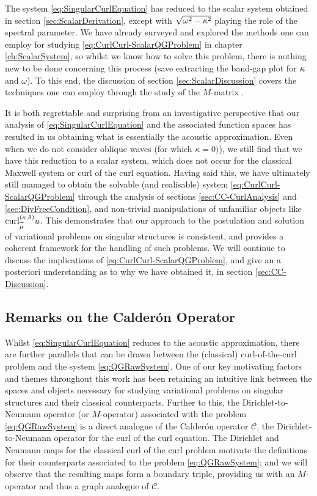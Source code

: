 The system \eqref{eq:SingularCurlEquation} has reduced to the scalar system obtained in section \ref{sec:ScalarDerivation}, except with $\sqrt{\omega^2-\kappa^2}$ playing the role of the spectral parameter.
We have already surveyed and explored the methods one can employ for studying \eqref{eq:CurlCurl-ScalarQGProblem} in chapter \ref{ch:ScalarSystem}, so whilst we know how to solve this problem, there is nothing new to be done concerning this process (save extracting the band-gap plot for $\kappa$ and $\omega$).
To this end, the discussion of section \ref{sec:ScalarDiscussion} covers the techniques one can employ through the study of the $M$-matrix .

It is both regrettable and surprising from an investigative perspective that our analysis of \eqref{eq:SingularCurlEquation} and the associated function spaces has resulted in us obtaining what is essentially the acoustic approximation.
Even when we do not consider oblique waves (for which $\kappa=0)$), we still find that we have this reduction to a scalar system, which does not occur for the classical Maxwell system or curl of the curl equation.
Having said this, we have ultimately still managed to obtain the solvable (and realisable) system \eqref{eq:CurlCurl-ScalarQGProblem} through the analysis of sections \ref{sec:CC-CurlAnalysis} and \ref{sec:DivFreeCondition}, and non-trivial manipulations of unfamiliar objects like $\mathrm{curl}_{\widetilde{\mu}}^{\left( \kappa, \theta \right)}u$.
This demonstrates that our approach to the postulation and solution of variational problems on singular structures is consistent, and provides a coherent framework for the handling of such problems.
We will continue to discuss the implications of \eqref{eq:CurlCurl-ScalarQGProblem}, and give an a posteriori understanding as to why we have obtained it, in section \ref{sec:CC-Discussion}.

\subsection{Remarks on the Calder\'on Operator} \label{ssec:CalderonOp}
Whilst \eqref{eq:SingularCurlEquation} reduces to the acoustic approximation, there are further parallels that can be drawn between the (classical) curl-of-the-curl problem and the system \eqref{eq:QGRawSystem}.
One of our key motivating factors and themes throughout this work has been retaining an intuitive link between the spaces and objects necessary for studying variational problems on singular structures and their classical counterparts.
Further to this, the Dirichlet-to-Neumann operator (or $M$-operator) associated with the problem \eqref{eq:QGRawSystem} is a direct analogue of the Calder\'{o}n operator $\mathcal{C}$, the Dirichlet-to-Neumann operator for the curl of the curl equation.
The Dirichlet and Neumann maps for the classical curl of the curl problem motivate the definitions for their counterparts associated to the problem \eqref{eq:QGRawSystem}; and we will observe that the resulting maps form a boundary triple, providing us with an $M$-operator and thus a graph analogue of $\mathcal{C}$.


